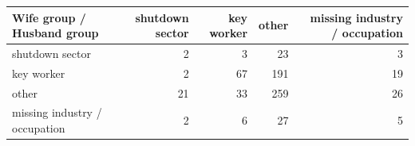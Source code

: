 
\begin{tabular}{lrrrr}
\toprule
Wife group / Husband group & shutdown sector & key worker & other & missing industry / occupation\\
\midrule
shutdown sector & 2 & 3 & 23 & 3\\
key worker & 2 & 67 & 191 & 19\\
other & 21 & 33 & 259 & 26\\
missing industry / occupation & 2 & 6 & 27 & 5\\
\bottomrule
\end{tabular}
